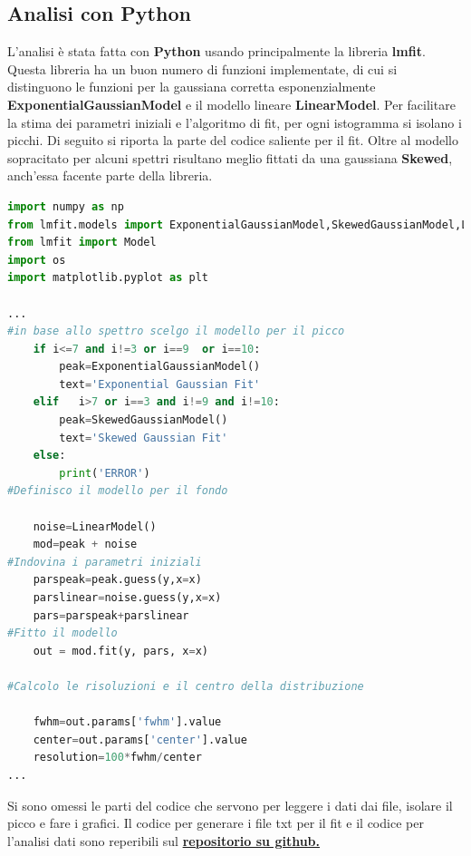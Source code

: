 \documentclass[a4paper]{article}
\begin{document}
\subsection{Analisi con Python}
L'analisi è stata fatta con \textbf{Python} usando principalmente la libreria \textbf{lmfit}. Questa libreria ha un buon numero di funzioni implementate, di cui si distinguono le funzioni per la gaussiana corretta esponenzialmente \textbf{ExponentialGaussianModel} e il modello lineare \textbf{LinearModel}. Per facilitare la stima dei parametri iniziali e l'algoritmo di fit, per ogni istogramma si isolano i picchi. Di seguito si riporta la parte del codice saliente per il fit. Oltre al modello sopracitato per alcuni spettri risultano meglio fittati da una gaussiana \textbf{Skewed}, anch'essa facente parte della libreria.
\begin{lstlisting}[language=Python]
import numpy as np
from lmfit.models import ExponentialGaussianModel,SkewedGaussianModel,LinearModel
from lmfit import Model
import os
import matplotlib.pyplot as plt

...
#in base allo spettro scelgo il modello per il picco
    if i<=7 and i!=3 or i==9  or i==10:
        peak=ExponentialGaussianModel()
        text='Exponential Gaussian Fit'
    elif   i>7 or i==3 and i!=9 and i!=10:
        peak=SkewedGaussianModel()
        text='Skewed Gaussian Fit'
    else:
        print('ERROR')
#Definisco il modello per il fondo

    noise=LinearModel()
    mod=peak + noise
#Indovina i parametri iniziali
    parspeak=peak.guess(y,x=x)
    parslinear=noise.guess(y,x=x)
    pars=parspeak+parslinear
#Fitto il modello
    out = mod.fit(y, pars, x=x)
    
#Calcolo le risoluzioni e il centro della distribuzione

    fwhm=out.params['fwhm'].value
    center=out.params['center'].value
    resolution=100*fwhm/center
...
\end{lstlisting}
Si sono omessi le parti del codice che servono per leggere i dati dai file, isolare il picco e fare i grafici. Il codice per generare i file txt per il fit e il codice per l'analisi dati sono reperibili sul \href{https://github.com/Jake145/Gruppo-3-Lab-Fisica-Medica/tree/master/BGORESOLUTION}{\textbf{repositorio su github.}}
\end{document}
